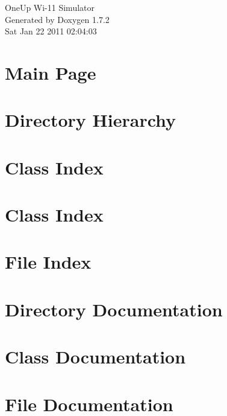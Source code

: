 \documentclass[letterpaper]{book}
\begin{document}
\hypersetup{pageanchor=false}
\begin{titlepage}
\vspace*{7cm}
\begin{center}
{\Large OneUp Wi-\/11 Simulator }\\
\vspace*{1cm}
{\large Generated by Doxygen 1.7.2}\\
\vspace*{0.5cm}
{\small Sat Jan 22 2011 02:04:03}\\
\end{center}
\end{titlepage}
\clearemptydoublepage
{}
\tableofcontents
\clearemptydoublepage
{}
\hypersetup{pageanchor=true}
\chapter{Main Page}
\label{index}\hypertarget{index}{}
\chapter{Directory Hierarchy}

\chapter{Class Index}

\chapter{Class Index}

\chapter{File Index}

\chapter{Directory Documentation}



\chapter{Class Documentation}
















\chapter{File Documentation}




\printindex
\end{document}
